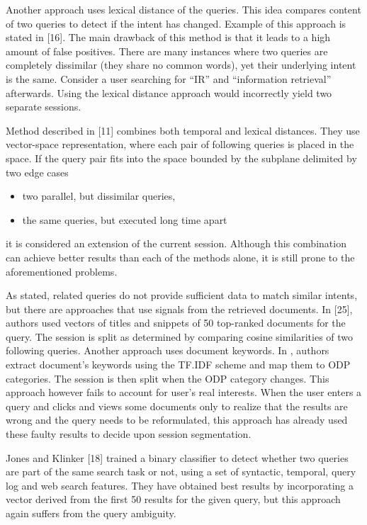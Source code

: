 \documentclass{acm_proc_article-sp} %
\begin{document}
Another approach uses lexical distance of the queries. This
idea compares content of two queries to detect if the intent
has changed. Example of this approach is stated in [16].
The main drawback of this method is that it leads to a high
amount of false positives. There are many instances where
two queries are completely dissimilar (they share no common
words), yet their underlying intent is the same. Consider
a user searching for “IR” and “information retrieval”
afterwards. Using the lexical distance approach would incorrectly
yield two separate sessions.

Method described in [11] combines both temporal and lexical
distances. They use vector-space representation, where each
pair of following queries is placed in the space. If the query
pair fits into the space bounded by the subplane delimited
by two edge cases

\begin{itemize} 
	\item two parallel, but dissimilar queries,
	\item the same queries, but executed long time apart
\end{itemize}

it is considered an extension of the current session. Although
this combination can achieve better results than each of the
methods alone, it is still prone to the aforementioned problems.

As stated, related queries do not provide sufficient data to
match similar intents, but there are approaches that use
signals from the retrieved documents. In [25], authors used
vectors of titles and snippets of 50 top-ranked documents
for the query. The session is split as determined by comparing
cosine similarities of two following queries. Another
approach uses document keywords. In \cite{Daoud:1}, authors extract
document’s keywords using the TF.IDF scheme and map
them to ODP categories. The session is then split when the
ODP category changes. This approach however fails to account
for user’s real interests. When the user enters a query
and clicks and views some documents only to realize that the
results are wrong and the query needs to be reformulated,
this approach has already used these faulty results to decide
upon session segmentation.

Jones and Klinker [18] trained a binary classifier to detect
whether two queries are part of the same search task or not,
using a set of syntactic, temporal, query log and web search
features. They have obtained best results by incorporating
a vector derived from the first 50 results for the given query,
but this approach again suffers from the query ambiguity.
\end{document}
